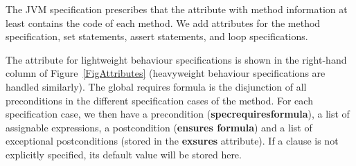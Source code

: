 
The JVM specification prescribes that the attribute with method
information at least contains the code of each method. We add
attributes for the method specification, set statements,
assert statements, and loop specifications.  

The attribute for lightweight behaviour specifications is shown in the
right-hand column of Figure~\ref{FigAttributes} (heavyweight behaviour
specifications are handled similarly).  The global requires formula is
the disjunction of all preconditions in the different specification
cases of the method. For each specification case, we then have a
precondition (\textbf{spec\unsc requires\unsc formula}), a list of
assignable expressions, a postcondition (\textbf{ensures\unsc
formula}) and a list of exceptional postconditions (stored in the
\textbf{exsures} attribute). If a clause is not explicitly specified,
its default value will be stored here. 


